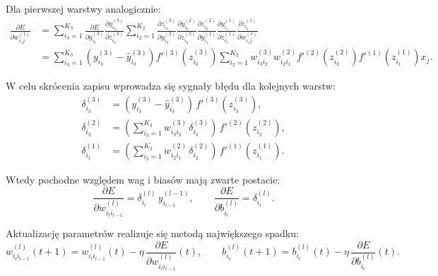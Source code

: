 \documentclass[12pt,twoside]{article}
\begin{document}
Dla pierwszej warstwy analogicznie:
\begin{equation}
\begin{aligned}
\frac{\partial E}{\partial w^{(1)}_{i_1 j}}
&= \sum_{i_3=1}^{K_3}
\frac{\partial E}{\partial y_{i_3}^{(3)}}
\frac{\partial y_{i_3}^{(3)}}{\partial z_{i_3}^{(3)}}
\sum_{i_2=1}^{K_2}
\frac{\partial z_{i_3}^{(3)}}{\partial y_{i_2}^{(2)}}
\frac{\partial y_{i_2}^{(2)}}{\partial z_{i_2}^{(2)}}
\frac{\partial z_{i_2}^{(2)}}{\partial y_{i_1}^{(1)}}
\frac{\partial y_{i_1}^{(1)}}{\partial z_{i_1}^{(1)}}
\frac{\partial z_{i_1}^{(1)}}{\partial w^{(1)}_{i_1 j}} \\
&= \sum_{i_3=1}^{K_3}
\left(y_{i_3}^{(3)}-\hat{y}_{i_3}^{(3)}\right)
f'^{(3)}\!\left(z_{i_3}^{(3)}\right)
\sum_{i_2=1}^{K_2}
w^{(3)}_{i_3 i_2}
w^{(2)}_{i_2 i_1}
f'^{(2)}\!\left(z_{i_2}^{(2)}\right)
f'^{(1)}\!\left(z_{i_1}^{(1)}\right)
x_j.
\end{aligned}
\end{equation}

W celu skrócenia zapisu wprowadza się sygnały błędu dla kolejnych warstw:
\begin{equation}
\begin{aligned}
\delta^{(3)}_{i_3} &= \left(y_{i_3}^{(3)}-\hat{y}_{i_3}^{(3)}\right)\,f'^{(3)}\!\left(z_{i_3}^{(3)}\right),\\
\delta^{(2)}_{i_2} &= \left(\sum_{i_3=1}^{K_3} w^{(3)}_{i_3 i_2}\,\delta^{(3)}_{i_3}\right)\,f'^{(2)}\!\left(z_{i_2}^{(2)}\right),\\
\delta^{(1)}_{i_1} &= \left(\sum_{i_2=1}^{K_2} w^{(2)}_{i_2 i_1}\,\delta^{(2)}_{i_2}\right)\,f'^{(1)}\!\left(z_{i_1}^{(1)}\right).
\end{aligned}
\end{equation}

Wtedy pochodne względem wag i biasów mają zwarte postacie:
\begin{equation}
\frac{\partial E}{\partial w^{(l)}_{i_l i_{l-1}}} = \delta^{(l)}_{i_l}\,y_{i_{l-1}}^{(l-1)},
\qquad
\frac{\partial E}{\partial b^{(l)}_{i_l}} = \delta^{(l)}_{i_l}.
\end{equation}

Aktualizację parametrów realizuje się metodą największego spadku:
\begin{equation}
w^{(l)}_{i_l i_{l-1}}(t+1)=w^{(l)}_{i_l i_{l-1}}(t)-\eta\,\frac{\partial E}{\partial w^{(l)}_{i_l i_{l-1}}}(t),
\qquad
b^{(l)}_{i_l}(t+1)=b^{(l)}_{i_l}(t)-\eta\,\frac{\partial E}{\partial b^{(l)}_{i_l}}(t).
\end{equation}
\end{document}
